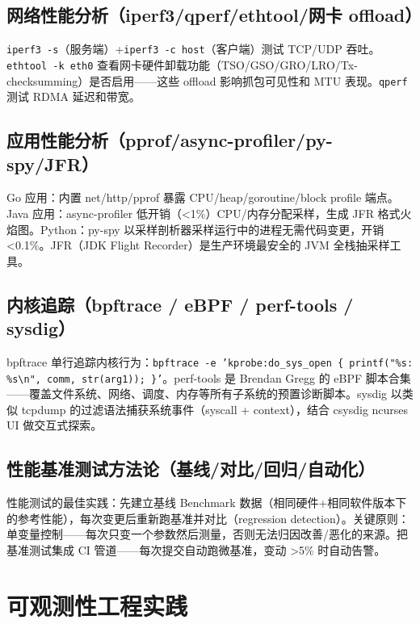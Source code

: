 \documentclass[12pt,UTF8]{ctexbook}
\begin{document}
  \section{网络性能分析（iperf3/qperf/ethtool/网卡 offload）}

\texttt{iperf3 -s}（服务端）+\texttt{iperf3 -c host}（客户端）测试 TCP/UDP 吞吐。\texttt{ethtool -k eth0} 查看网卡硬件卸载功能（TSO/GSO/GRO/LRO/Tx-checksumming）是否启用——这些 offload 影响抓包可见性和 MTU 表现。\texttt{qperf} 测试 RDMA 延迟和带宽。

  \section{应用性能分析（pprof/async-profiler/py-spy/JFR）}

Go 应用：内置 net/http/pprof 暴露 CPU/heap/goroutine/block profile 端点。Java 应用：async-profiler 低开销（<1\%）CPU/内存分配采样，生成 JFR 格式火焰图。Python：py-spy 以采样剖析器采样运行中的进程无需代码变更，开销 <0.1\%。JFR（JDK Flight Recorder）是生产环境最安全的 JVM 全栈抽采样工具。

  \section{内核追踪（bpftrace / eBPF / perf-tools / sysdig）}

bpftrace 单行追踪内核行为：\texttt{bpftrace -e 'kprobe:do\_sys\_open \{ printf("\%s: \%s\textbackslash n", comm, str(arg1)); \}'}。perf-tools 是 Brendan Gregg 的 eBPF 脚本合集——覆盖文件系统、网络、调度、内存等所有子系统的预置诊断脚本。sysdig 以类似 tcpdump 的过滤语法捕获系统事件（syscall + context），结合 csysdig ncurses UI 做交互式探索。

  \section{性能基准测试方法论（基线/对比/回归/自动化）}

性能测试的最佳实践：先建立基线 Benchmark 数据（相同硬件+相同软件版本下的参考性能），每次变更后重新跑基准并对比（regression detection）。关键原则：单变量控制——每次只变一个参数然后测量，否则无法归因改善/恶化的来源。把基准测试集成 CI 管道——每次提交自动跑微基准，变动 >5\% 时自动告警。




\chapter{可观测性工程实践}
\label{chap:observability-engineering}
\end{document}
